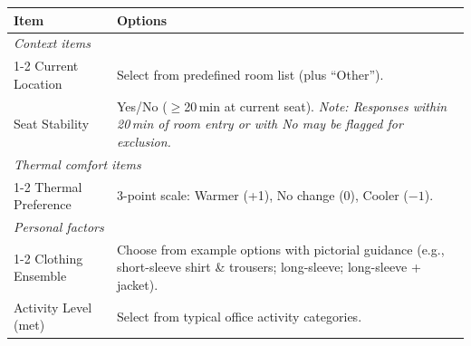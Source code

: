 \centering
\label{tab:survey_items} 
\small
\renewcommand{\arraystretch}{1.3} %
\begin{tabularx}{\textwidth}{l X}
\toprule
\textbf{Item} & \textbf{Options} \\
\midrule
\multicolumn{2}{l}{\textit{Context items}} \\
\cmidrule(r){1-2} %
Current Location & Select from predefined room list (plus ``Other''). \\
Seat Stability   & Yes/No ($\geq$20\,min at current seat). \textit{Note: Responses within 20\,min of room entry or with No may be flagged for exclusion.} \\
\midrule
\multicolumn{2}{l}{\textit{Thermal comfort items}} \\
\cmidrule(r){1-2}
Thermal Preference     & 3-point scale: Warmer (+1), No change (0), Cooler ($-1$). \\
\midrule
\multicolumn{2}{l}{\textit{Personal factors}} \\
\cmidrule(r){1-2}
Clothing Ensemble & Choose from example options with pictorial guidance (e.g., short-sleeve shirt \& trousers; long-sleeve; long-sleeve + jacket). \\
Activity Level (met) & Select from typical office activity categories. \\
\bottomrule
\end{tabularx}
